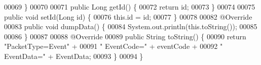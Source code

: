 \begin{DoxyCode}
00069     \}
00070 
00071     \textcolor{keyword}{public} Long getId() \{
00072         \textcolor{keywordflow}{return} id;
00073     \}
00074 
00075     \textcolor{keyword}{public} \textcolor{keywordtype}{void} setId(Long \textcolor{keywordtype}{id}) \{
00076         this.\textcolor{keywordtype}{id} = id;
00077     \}
00078 
00082     @Override
00083     \textcolor{keyword}{public} \textcolor{keywordtype}{void} dumpData() \{
00084         System.out.println(this.toString());
00085 
00086     \}
00087 
00088     @Override
00089     \textcolor{keyword}{public} String toString() \{
00090         \textcolor{keywordflow}{return} \textcolor{stringliteral}{"PacketType=Event"} +
00091                 \textcolor{stringliteral}{" EventCode="} + eventCode +
00092                 \textcolor{stringliteral}{" EventData="} + EventData;
00093     \}
00094 \}
\end{DoxyCode}
